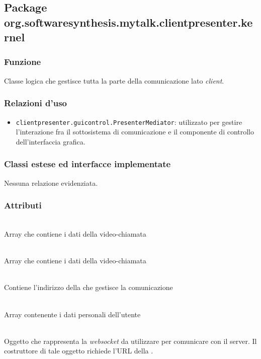 \subsection{Package org.softwaresynthesis.mytalk.clientpresenter.kernel}\label{sec:kernel}

\subsubsection*{Funzione}
Classe logica che gestisce tutta la parte della comunicazione lato \textit{client}.

\subsubsection*{Relazioni d'uso}
\begin{itemize}
  \item \texttt{clientpresenter.guicontrol.PresenterMediator}: utilizzato per gestire l'interazione fra il sottosistema di comunicazione e il componente di controllo dell'interfaccia grafica.
\end{itemize}

\subsubsection*{Classi estese ed interfacce implementate}
Nessuna relazione evidenziata.

\subsubsection*{Attributi}
\begin{description}
\item{}\\
Array che contiene i dati della video-chiamata
\item{}\\
Array che contiene i dati della video-chiamata
\item{}\\
Contiene l'indirizzo della  che gestisce la comunicazione
\item{}\\
Array contenente i dati personali dell'utente
\item{}\\
Oggetto che rappresenta la \textit{websocket} da utilizzare per comunicare con il server. Il costruttore di tale oggetto richiede l'URL della .

\end{description}


